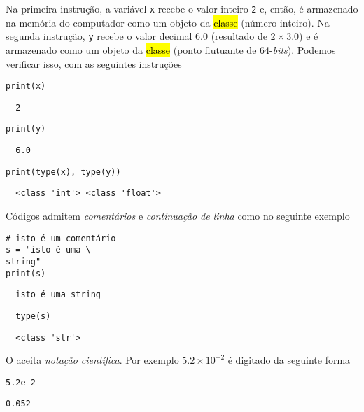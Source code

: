 \documentclass[a4paper,10pt,twoside]{article}
\begin{document}
Na primeira instrução, a variável \texttt{x} recebe o valor inteiro \texttt{2} e, então, é armazenado na memória do computador como um objeto da \hl{classe {\PYTHONint}} (número inteiro). Na segunda instrução, \texttt{y} recebe o valor decimal $6.0$ (resultado de $2\times 3.0$) e é armazenado como um objeto da \hl{classe {\PYTHONfloat}} (ponto flutuante de 64-{\it bits}). Podemos verificar isso, com as seguintes instruções

\begin{lstlisting}
print(x)
\end{lstlisting}

\begin{verbatim}
  2
\end{verbatim}

\begin{lstlisting}
print(y)
\end{lstlisting}

\begin{verbatim}
  6.0
\end{verbatim}

\begin{lstlisting}
print(type(x), type(y))
\end{lstlisting}

\begin{verbatim}
  <class 'int'> <class 'float'>
\end{verbatim}

\begin{obs}
  Códigos {\python} admitem \emph{comentários} e \emph{continuação de linha} como no seguinte exemplo

\begin{lstlisting}
# isto é um comentário
s = "isto é uma \
string"
print(s)
\end{lstlisting}

\begin{verbatim}
  isto é uma string
\end{verbatim}

\begin{lstlisting}
  type(s)
\end{lstlisting}

\begin{verbatim}
  <class 'str'>
\end{verbatim}

\end{obs}

\begin{obs}
  O {\python} aceita \emph{notação científica}. Por exemplo $5.2\times 10^{-2}$ é digitado da seguinte forma

\begin{lstlisting}
5.2e-2
\end{lstlisting}

\begin{verbatim}
0.052
\end{verbatim}

\end{obs}
\end{document}
